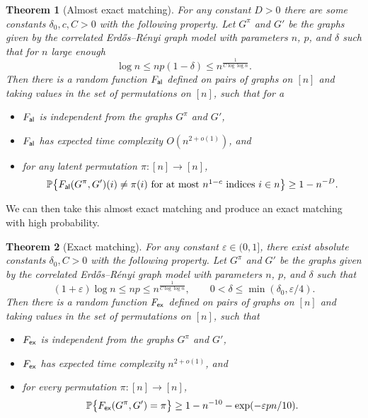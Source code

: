 \documentclass[11pt]{article}
\newtheorem{theoremIntro}{Theorem}
\def\Pp{\mathbb P}
\begin{document}
	\begin{theoremIntro}[Almost exact matching]
		\label{thm:main-1-intro}
		For any constant $ D>0 $ there are some constants $ \delta_0, c, C > 0 $ with the following property.
		Let $G^\pi$ and $G'$ be the graphs given by the correlated Erd\H{o}s--R\'enyi graph model 		with parameters $n$, $p$, and $\delta$ such that for $ n $ large enough
		$$
		\log n \le np (1-\delta) \le n^{\frac{1}{C \log \log n}} . 
		$$
		Then there is a random function $F_{\sf al}$ defined on pairs of graphs on $[n]$ and taking values in the 
		set of permutations on $[n]$,
		such that for a
		\begin{itemize}
			\item $F_{\sf al}$ is independent from the graphs $G^\pi$ and $G'$,
			\item $F_{\sf al}$ has expected time complexity $O(n^{2+o(1)})$, and
			\item for any latent permutation $\pi:[n] \to [n]$,
			\begin{align*}
				\Pp\big\{F_{\sf al}(G^\pi,G')(i)\neq \pi(i)\mbox{ for at most $n^{1-c}$ indices $i \in n$}
				\big\}\geq 1 - n^{-D}.
			\end{align*}
		\end{itemize}
	\end{theoremIntro}
	
	We can then take this almost exact matching and produce an exact matching with high probability.
	\begin{theoremIntro}[Exact matching]
		\label{thm:main-2-intro}
		For any constant  $\varepsilon\in (0,1]$, there
		exist absolute constants $\delta_0, C > 0$ with the following property. 
		Let $G^\pi$ and $G'$ be the graphs given by the correlated Erd\H{o}s--R\'enyi graph model with parameters $n$, $p$, and $\delta$ such that 
		$$
		(1+\varepsilon) \log n \le np \le n^{\frac{1}{C \log \log n}}, \qquad 
		0 < \delta \leq \min(\delta_0,\varepsilon/4). 
		$$
		Then there is a random function $F_{\sf ex}$ defined on pairs of graphs on $[n]$ and taking values in the 
		set of permutations on $[n]$,
		such that 
		\begin{itemize}
			\item $F_{\sf ex}$ is independent from the graphs $G^\pi$ and $G'$,
			\item $F_{\sf ex}$ has expected time complexity $n^{2+o(1)}$, and
			\item for every permutation $\pi:[n] \to [n]$,
			\begin{align*}
				\Pp\big\{F_{\sf ex}(G^\pi,G')= \pi\big\}\ge 1 - n^{-10}-\exp(-\varepsilon pn/10).
			\end{align*}
		\end{itemize}
	\end{theoremIntro}
\end{document}
